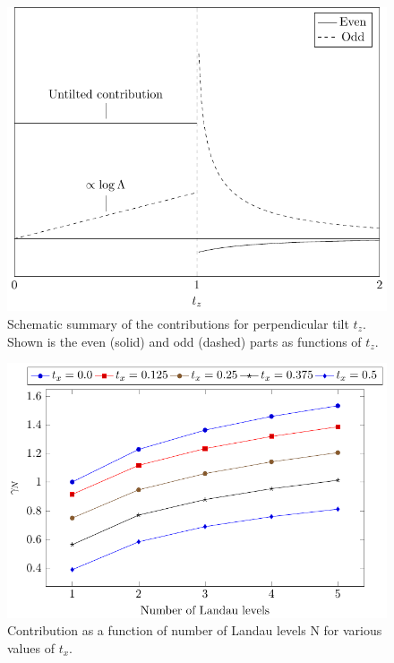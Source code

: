 \documentclass[%
 reprint,
 amsmath,amssymb,
 aps,
]{revtex4-2}
\begin{document}
\begin{figure}[p]
  \centering
  \includegraphics[width=.8\textwidth]{figures/schematic_tz}
  \caption{Schematic summary of the contributions for perpendicular tilt \(t_z \). Shown is the even (solid) and odd (dashed) parts as functions of \(t_z\).}
  \label{fig:schematic_tz}
\end{figure}

\begin{figure}[p]
  \centering
  \includegraphics[width=.8\textwidth]{figures/contribtx}
  \caption{\label{fig:contribtx}Contribution as a function of number of Landau levels N for various values of \(t_x\).}
\end{figure}


\nocite{*}

\end{document}

